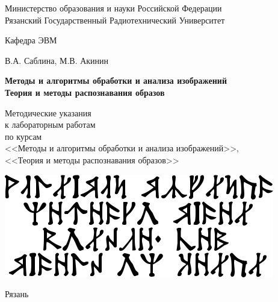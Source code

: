 
\begin{titlepage}

\begin{center}

Министерство образования и науки Российской Федерации \\
Рязанский Государственный Радиотехнический Университет

\bigskip

Кафедра ЭВМ

\vspace{5em}

В.А. Саблина, М.В. Акинин

\vspace{3em}

{\Large \bf Методы и алгоритмы обработки и анализа изображений \\
Теория и методы распознавания образов}

\vspace{3em}

Методические указания\\
к лабораторным работам\\
по курсам \\
<<Методы и алгоритмы обработки и анализа изображений>>, \\
<<Теория и методы распознавания образов>>

\vfill

\includegraphics[]{image/title_cirth.png} %

\vfill

Рязань \the\year

\end{center}

\thispagestyle{empty}

\end{titlepage}

\setcounter{page}{2}

\newpage

